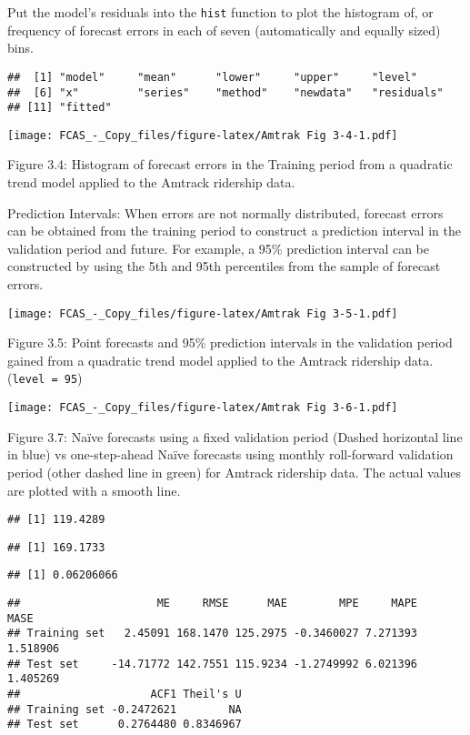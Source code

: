 \documentclass[]{article}
\begin{document}
Put the model's residuals into the \texttt{hist} function to plot the
histogram of, or frequency of forecast errors in each of seven
(automatically and equally sized) bins.

\begin{verbatim}
##  [1] "model"     "mean"      "lower"     "upper"     "level"    
##  [6] "x"         "series"    "method"    "newdata"   "residuals"
## [11] "fitted"
\end{verbatim}

\texttt{[image: FCAS\_-\_Copy\_files/figure-latex/Amtrak Fig 3-4-1.pdf]}

Figure 3.4: Histogram of forecast errors in the Training period from a
quadratic trend model applied to the Amtrack ridership data.

Prediction Intervals: When errors are not normally distributed, forecast
errors can be obtained from the training period to construct a
prediction interval in the validation period and future. For example, a
95\% prediction interval can be constructed by using the 5th and 95th
percentiles from the sample of forecast errors.

\texttt{[image: FCAS\_-\_Copy\_files/figure-latex/Amtrak Fig 3-5-1.pdf]}

Figure 3.5: Point forecasts and 95\% prediction intervals in the
validation period gained from a quadratic trend model applied to the
Amtrack ridership data. (\texttt{level\ =\ 95})

\texttt{[image: FCAS\_-\_Copy\_files/figure-latex/Amtrak Fig 3-6-1.pdf]}

Figure 3.7: Naïve forecasts using a fixed validation period (Dashed
horizontal line in blue) vs one-step-ahead Naïve forecasts using monthly
roll-forward validation period (other dashed line in green) for Amtrack
ridership data. The actual values are plotted with a smooth line.

\begin{verbatim}
## [1] 119.4289
\end{verbatim}

\begin{verbatim}
## [1] 169.1733
\end{verbatim}

\begin{verbatim}
## [1] 0.06206066
\end{verbatim}

\begin{verbatim}
##                     ME     RMSE      MAE        MPE     MAPE     MASE
## Training set   2.45091 168.1470 125.2975 -0.3460027 7.271393 1.518906
## Test set     -14.71772 142.7551 115.9234 -1.2749992 6.021396 1.405269
##                    ACF1 Theil's U
## Training set -0.2472621        NA
## Test set      0.2764480 0.8346967
\end{verbatim}
\end{document}
